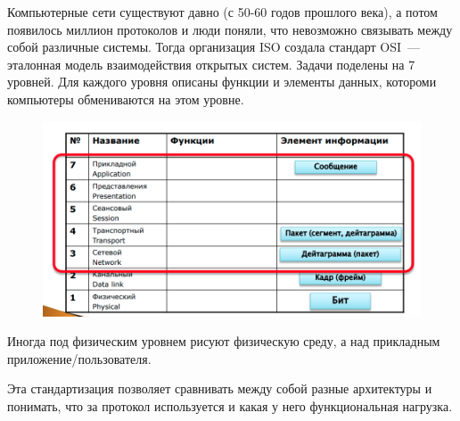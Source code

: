 

Компьютерные сети существуют давно (с 50-60 годов прошлого века), а потом появилось миллион протоколов и люди поняли, что невозможно связывать между собой различные системы. Тогда организация ISO создала стандарт OSI~--- эталонная модель взаимодействия открытых систем. Задачи поделены на 7 уровней. Для каждого уровня описаны функции и элементы данных, котороми компьютеры обмениваются на этом уровне.

\begin{figure}[H]
  \centering
  \includegraphics[width=15cm]{images/00/01}
\end{figure}

Иногда под физическим уровнем рисуют физическую среду, а над прикладным приложение/пользователя.

Эта стандартизация позволяет сравнивать между собой разные архитектуры и понимать, что за протокол используется и какая у него функциональная нагрузка.

